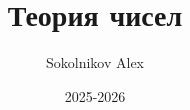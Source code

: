 

\title{\Huge Теория чисел}
\author{\huge Sokolnikov Alex}
\date{\LARGE 2025-2026}


    \pagestyle{fancy}
    \maketitle
    \tableofcontents
    \newpage


